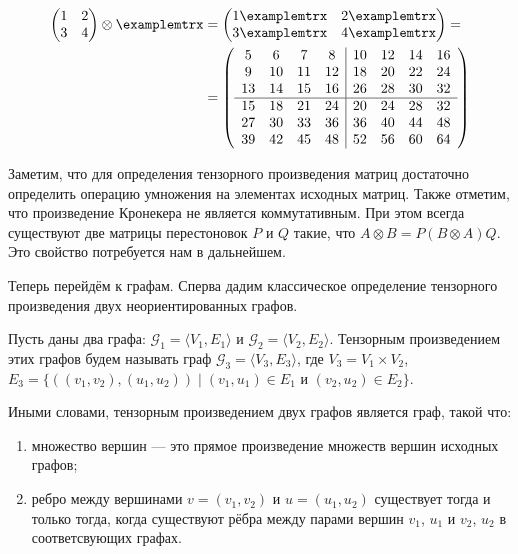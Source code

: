 \begin{example}
\begin{align}
\begin{pmatrix}
1 & 2 \\
3 & 4
\end{pmatrix}
\otimes
\examplemtrx &=
\begin{pmatrix}
1\examplemtrx & 2\examplemtrx \\
3\examplemtrx & 4\examplemtrx
\end{pmatrix}
=\notag \\
&=
\left(\begin{array}{c c c c | c c c c}
5  & 6  & 7  & 8  & 10 & 12 & 14 & 16 \\
9  & 10 & 11 & 12 & 18 & 20 & 22 & 24 \\
13 & 14 & 15 & 16 & 26 & 28 & 30 & 32 \\
\hline
15 & 18 & 21 & 24 & 20 & 24 & 28 & 32 \\
27 & 30 & 33 & 36 & 36 & 40 & 44 & 48 \\
39 & 42 & 45 & 48 & 52 & 56 & 60 & 64 
\end{array}\right)
\end{align}
\end{example}

Заметим, что для определения тензорного произведения матриц достаточно определить операцию умножения на элементах исходных матриц.
Также отметим, что произведение Кронекера не является коммутативным.
При этом всегда существуют две матрицы перестоновок $P$ и $Q$ такие, что $A \otimes B = P(B \otimes A)Q$.
Это свойство потребуется нам в дальнейшем.

Теперь перейдём к графам.
Сперва дадим классическое определение тензорного произведения двух неориентированных графов.

\begin{definition}
Пусть даны два графа: $\mathcal{G}_1 = \langle V_1, E_1\rangle$ и $\mathcal{G}_2 = \langle V_2, E_2\rangle$. 
Тензорным произведением этих графов будем называть граф $\mathcal{G}_3 = \langle V_3, E_3\rangle$, где $V_3 = V_1 \times V_2$, $E_3 = \{ ((v_1,v_2),(u_1,u_2)) \mid (v_1,u_1) \in E_1 \text{ и } (v_2,u_2) \in E_2 \}$.
\end{definition}

Иными словами, тензорным произведением двух графов является граф, такой что:
\begin{enumerate}
 \item множество вершин --- это прямое произведение множеств вершин исходных графов;
 \item ребро между вершинами $v=(v_1,v_2)$ и $u=(u_1,u_2)$ существует тогда и только тогда, когда существуют рёбра между парами вершин $v_1$, $u_1$ и $v_2$, $u_2$ в соответсвующих графах. 
\end{enumerate}

